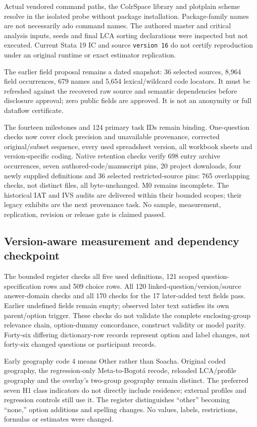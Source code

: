 \documentclass[11pt,a4paper]{article}
\begin{document}
Actual vendored command paths, the ColrSpace library and plotplain scheme resolve in the isolated probe without package installation. Package-family names are not necessarily ado command names. The authored master and critical analysis inputs, seeds and final LCA sorting declarations were inspected but not executed. Current Stata 19 IC and source \texttt{version 16} do not certify reproduction under an original runtime or exact estimator replication.

The earlier field proposal remains a dated snapshot: 36 selected sources, 8,964 field occurrences, 679 names and 5,654 lexical/wildcard code locators. It must be refreshed against the recovered raw source and semantic dependencies before disclosure approval; zero public fields are approved. It is not an anonymity or full dataflow certificate.

The fourteen milestones and 124 primary task IDs remain binding. One-question checks now cover clock precision and unavailable provenance, corrected original/subset sequence, every used spreadsheet version, all workbook sheets and version-specific coding. Native retention checks verify 698 entry archive occurrences, seven authored-code/manuscript pins, 20 project downloads, four newly supplied definitions and 36 selected restricted-source pins: 765 overlapping checks, not distinct files, all byte-unchanged. M0 remains incomplete. The historical IAT and IVS audits are delivered within their bounded scopes; their legacy exhibits are the next provenance task. No sample, measurement, replication, revision or release gate is claimed passed.


\subsection{Version-aware measurement and dependency checkpoint}
The bounded register checks all five used definitions, 121 scoped question-specification rows and 509 choice rows. All 120 linked-question/version/source answer-domain checks and all 170 checks for the 17 later-added text fields pass. Earlier undefined fields remain empty; observed later text satisfies its own parent/option trigger. These checks do not validate the complete enclosing-group relevance chain, option-dummy concordance, construct validity or model parity. Forty-six differing dictionary-row records represent option and label changes, not forty-six changed questions or participant records.

Early geography code 4 means Other rather than Soacha. Original coded geography, the regression-only Meta-to-Bogot\'a recode, reloaded LCA/profile geography and the overlay's two-group geography remain distinct. The preferred seven H1 class indicators do not directly include residence; external profiles and regression controls still use it. The register distinguishes ``other'' becoming ``none,'' option additions and spelling changes. No values, labels, restrictions, formulas or estimates were changed.
\end{document}
